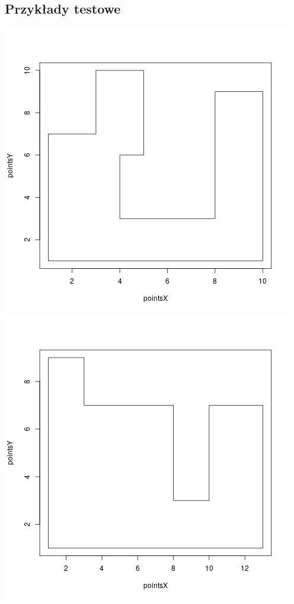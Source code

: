 \documentclass[12pt,a4paper]{article}
\begin{document}
\subsection{Przykłady testowe}
\includegraphics[scale=0.4]{mediumMap.png} 
\includegraphics[scale=0.4]{mediumMap2.png} \\
\end{document}
